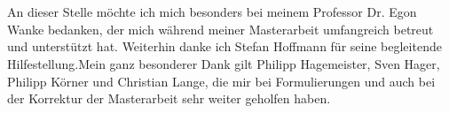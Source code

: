 \section*{}
An dieser Stelle möchte ich mich besonders bei meinem Professor Dr. Egon Wanke bedanken, der mich während meiner Masterarbeit umfangreich betreut und unterstützt hat. Weiterhin danke ich Stefan Hoffmann für seine begleitende Hilfestellung.\newline Mein ganz besonderer Dank gilt Philipp Hagemeister, Sven Hager, Philipp Körner und Christian Lange, die mir bei Formulierungen und auch bei der Korrektur der Masterarbeit sehr weiter geholfen haben. 
\clearpage 

\thispagestyle{empty}
~
\newpage

\thispagestyle{empty}
\section*{}

